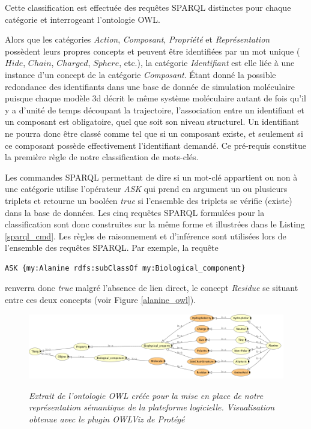 Cette classification est effectuée des requêtes SPARQL distinctes pour chaque catégorie et interrogeant l'ontologie OWL.

Alors que les catégories \textit{Action}, \textit{Composant}, \textit{Propriété} et \textit{Représentation} possèdent leurs propres concepts et peuvent être identifiées par un mot unique ($Hide$, $Chain$, $Charged$, $Sphere$, etc.), la catégorie \textit{Identifiant} est elle liée à une instance d'un concept de la catégorie \textit{Composant}. Étant donné la possible redondance des identifiants dans une base de donnée de simulation moléculaire puisque chaque modèle 3d décrit le même système moléculaire autant de fois qu'il y a d'unité de temps découpant la trajectoire, l'association entre un identifiant et un composant est obligatoire, quel que soit son niveau structurel. Un identifiant ne pourra donc être classé comme tel que si un composant existe, et seulement si ce composant possède effectivement l'identifiant demandé. Ce pré-requis constitue la première règle de notre classification de mots-clés.

Les commandes SPARQL permettant de dire si un mot-clé appartient ou non à une catégorie utilise l'opérateur \textit{ASK} qui prend en argument un ou plusieurs triplets et retourne un booléen \textit{true} si l'ensemble des triplets se vérifie (existe) dans la base de données. Les cinq requêtes SPARQL formulées pour la classification sont donc construites sur la même forme et illustrées dans le Listing \ref{sparql_cmd}. Les règles de raisonnement et d'inférence sont utilisées lors de l'ensemble des requêtes SPARQL. Par exemple, la requête

\begin{lstlisting}[language=XML]
ASK {my:Alanine rdfs:subClassOf my:Biological_component}
\end{lstlisting}

renverra donc \textit{true} malgré l'absence de lien direct, le concept \textit{Residue} se situant entre ces deux concepts (voir Figure \ref{alanine_owl}).

\begin{figure}
  \centering
  {\includegraphics[width=0.8\linewidth]{./figures/ch5/alanine_owl}}
    \caption{\it Extrait de l'ontologie OWL créée pour la mise en place de notre représentation sémantique de la plateforme logicielle. Visualisation obtenue avec le plugin OWLViz de Protégé}
  \label{Fig:alanine_owl}
  \hspace{0.3cm}
\end{figure}

